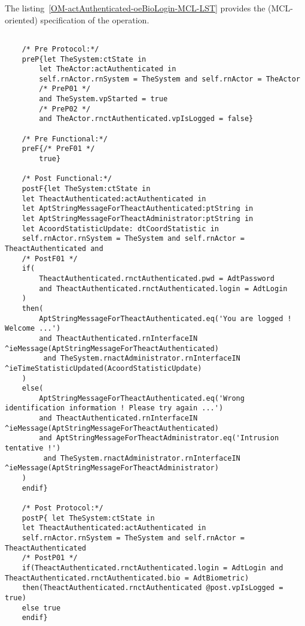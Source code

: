 	\vspace{1cm}
	The listing~\ref{OM-actAuthenticated-oeBioLogin-MCL-LST} provides the \msrmessir (MCL-oriented) specification of the operation.
	
	\scriptsize
	\vspace{0.5cm}
	\begin{lstlisting}[style=MessirStyle,firstnumber=auto,captionpos=b,caption={\msrmessir (MCL-oriented) specification of the operation \emph{oeBioLogin}.},label=OM-actAuthenticated-oeBioLogin-MCL-LST]

	/* Pre Protocol:*/ 
	preP{let TheSystem:ctState in
		let TheActor:actAuthenticated in
		self.rnActor.rnSystem = TheSystem and self.rnActor = TheActor
		/* PreP01 */
		and TheSystem.vpStarted = true
		/* PreP02 */
		and TheActor.rnctAuthenticated.vpIsLogged = false}
	
	/* Pre Functional:*/
	preF{/* PreF01 */
		true}
	
	/* Post Functional:*/ 
	postF{let TheSystem:ctState in
	let TheactAuthenticated:actAuthenticated in
	let AptStringMessageForTheactAuthenticated:ptString in
	let AptStringMessageForTheactAdministrator:ptString in
	let AcoordStatisticUpdate: dtCoordStatistic in
	self.rnActor.rnSystem = TheSystem and self.rnActor = TheactAuthenticated and
	/* PostF01 */
	if(
		TheactAuthenticated.rnctAuthenticated.pwd = AdtPassword 
		and TheactAuthenticated.rnctAuthenticated.login = AdtLogin
	)
	then(
		AptStringMessageForTheactAuthenticated.eq('You are logged ! Welcome ...') 
		and TheactAuthenticated.rnInterfaceIN ^ieMessage(AptStringMessageForTheactAuthenticated)
		 and TheSystem.rnactAdministrator.rnInterfaceIN ^ieTimeStatisticUpdated(AcoordStatisticUpdate)
	)
	else(
		AptStringMessageForTheactAuthenticated.eq('Wrong identification information ! Please try again ...') 
		and TheactAuthenticated.rnInterfaceIN ^ieMessage(AptStringMessageForTheactAuthenticated) 
		and AptStringMessageForTheactAdministrator.eq('Intrusion tentative !')
		 and TheSystem.rnactAdministrator.rnInterfaceIN ^ieMessage(AptStringMessageForTheactAdministrator)
	)
	endif}
	
	/* Post Protocol:*/ 
	postP{ let TheSystem:ctState in
	let TheactAuthenticated:actAuthenticated in
	self.rnActor.rnSystem = TheSystem and self.rnActor = TheactAuthenticated
	/* PostP01 */
	if(TheactAuthenticated.rnctAuthenticated.login = AdtLogin and TheactAuthenticated.rnctAuthenticated.bio = AdtBiometric)
	then(TheactAuthenticated.rnctAuthenticated @post.vpIsLogged = true)
	else true
	endif}
	
	\end{lstlisting}
	\normalsize 
	
	
	
	





